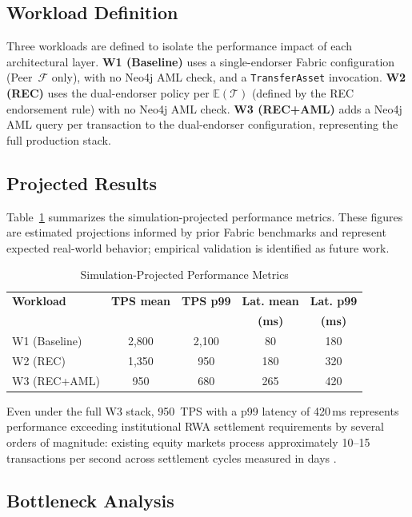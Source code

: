 \documentclass[journal,10pt,twocolumn]{IEEEtran}
\begin{document}
\subsection{Workload Definition}

Three workloads are defined to isolate the performance impact of each architectural layer. \textbf{W1 (Baseline)} uses a single-endorser Fabric configuration (Peer~$\mathcal{F}$ only), with no Neo4j AML check, and a \texttt{TransferAsset} invocation. \textbf{W2 (REC)} uses the dual-endorser policy per $\mathbb{E}(\mathcal{T})$ (defined by the REC endorsement rule) with no Neo4j AML check. \textbf{W3 (REC+AML)} adds a Neo4j AML query per transaction to the dual-endorser configuration, representing the full production stack.

\subsection{Projected Results}

Table~\ref{tab:perf} summarizes the simulation-projected performance metrics. These figures are estimated projections informed by prior Fabric benchmarks \cite{ref:manevich} and represent expected real-world behavior; empirical validation is identified as future work.

\begin{table}[htbp]
\centering
\caption{Simulation-Projected Performance Metrics}
\label{tab:perf}
\begin{tabular}{@{}lcccc@{}}
\toprule
\textbf{Workload} & \textbf{TPS mean} & \textbf{TPS p99} & \textbf{Lat. mean} & \textbf{Lat. p99} \\
 & & & \textbf{(ms)} & \textbf{(ms)} \\
\midrule
W1 (Baseline) & 2,800 & 2,100 & 80  & 180 \\
W2 (REC)      & 1,350 & 950   & 180 & 320 \\
W3 (REC+AML)  & 950   & 680   & 265 & 420 \\
\bottomrule
\end{tabular}
\end{table}

Even under the full W3 stack, 950~TPS with a p99 latency of 420\,ms represents performance exceeding institutional RWA settlement requirements by several orders of magnitude: existing equity markets process approximately 10--15 transactions per second across settlement cycles measured in days \cite{ref:ecb_dlt}.

\subsection{Bottleneck Analysis}
\end{document}
